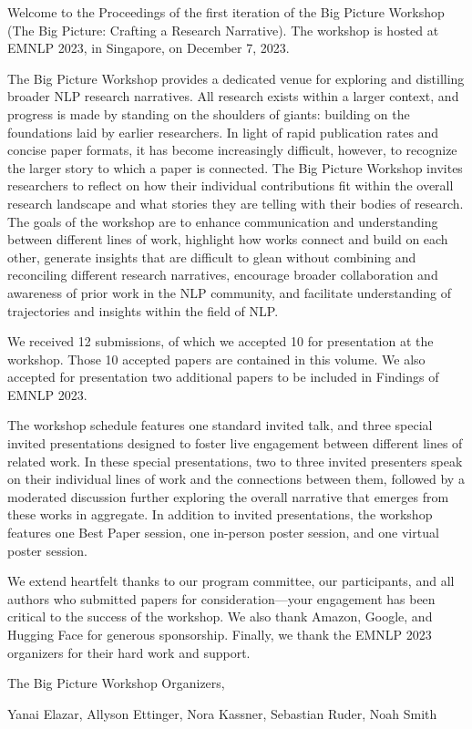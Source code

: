 Welcome to the Proceedings of the first iteration of the Big Picture Workshop (The Big Picture: Crafting a Research Narrative). The workshop is hosted at EMNLP 2023, in Singapore, on December 7, 2023. 

The Big Picture Workshop provides a dedicated venue for exploring and distilling broader NLP research narratives. All research exists within a larger context, and progress is made by standing on the shoulders of giants: building on the foundations laid by earlier researchers. In light of rapid publication rates and concise paper formats, it has become increasingly difficult, however, to recognize the larger story to which a paper is connected. The Big Picture Workshop invites researchers to reflect on how their individual contributions fit within the overall research landscape and what stories they are telling with their bodies of research. The goals of the workshop are to enhance communication and understanding between different lines of work, highlight how works connect and build on each other, generate insights that are difficult to glean without combining and reconciling different research narratives, encourage broader collaboration and awareness of prior work in the NLP community, and facilitate understanding of trajectories and insights within the field of NLP.

We received 12 submissions, of which we accepted 10 for presentation at the workshop. Those 10 accepted papers are contained in this volume. We also accepted for presentation two additional papers to be included in Findings of EMNLP 2023.

The workshop schedule features one standard invited talk, and three special invited presentations designed to foster live engagement between different lines of related work. In these special presentations, two to three invited presenters speak on their individual lines of work and the connections between them, followed by a moderated discussion further exploring the overall narrative that emerges from these works in aggregate. In addition to invited presentations, the workshop features one Best Paper session, one in-person poster session, and one virtual poster session.

We extend heartfelt thanks to our program committee, our participants, and all authors who submitted papers for consideration---your engagement has been critical to the success of the workshop. We also thank Amazon, Google, and Hugging Face for generous sponsorship. Finally, we thank the EMNLP 2023 organizers for their hard work and support. 

The Big Picture Workshop Organizers,

Yanai Elazar, Allyson Ettinger, Nora Kassner, Sebastian Ruder, Noah Smith
